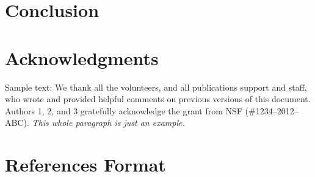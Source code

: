 \documentclass{sigchi}
\begin{document}



\section{Conclusion}



\section{Acknowledgments}

Sample text: We thank all the volunteers, and all publications support
and staff, who wrote and provided helpful comments on previous
versions of this document. Authors 1, 2, and 3 gratefully acknowledge
the grant from NSF (\#1234--2012--ABC). \textit{This whole paragraph is
  just an example.}

%
%
%
%
%
\balance{}

\section{References Format}




\end{document}
